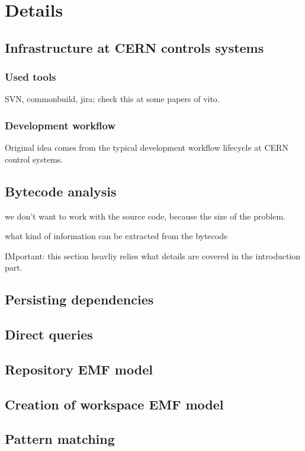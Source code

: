 \chapter{Details}

\section{Infrastructure at CERN controls systems}

\subsection{Used tools}
SVN, commonbuild, jira; check this at some papers of vito.

\subsection{Development workflow}
Original idea comes from the typical development workflow lifecycle at CERN control systems. 

\section{Bytecode analysis}
we don't want to work with the source code, because the size of the problem.

what kind of information can be extracted from the bytecode

IMportant: this section heavliy relies what details are covered in the introduction part.

\section{Persisting dependencies} 

\section{Direct queries}


\section{Repository EMF model}

\section{Creation of workspace EMF model}

\section{Pattern matching}

